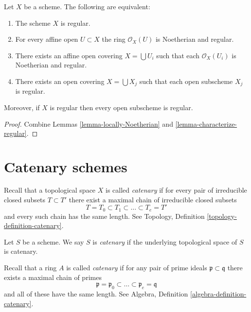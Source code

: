 \begin{lemma}
\label{lemma-locally-regular}
Let $X$ be a scheme. The following are equivalent:
\begin{enumerate}
\item The scheme $X$ is regular.
\item For every affine open $U \subset X$ the ring $\mathcal{O}_X(U)$
is Noetherian and regular.
\item There exists an affine open covering $X = \bigcup U_i$ such that
each $\mathcal{O}_X(U_i)$ is Noetherian and regular.
\item There exists an open covering $X = \bigcup X_j$
such that each open subscheme $X_j$ is regular.
\end{enumerate}
Moreover, if $X$ is regular then every open subscheme is regular.
\end{lemma}

\begin{proof}
Combine Lemmas \ref{lemma-locally-Noetherian}
and \ref{lemma-characterize-regular}.
\end{proof}








\section{Catenary schemes}
\label{section-catenary}

\noindent
Recall that a topological space $X$ is called {\it catenary} if
for every pair of irreducible closed subsets $T \subset T'$
there exist a maximal chain of irreducible closed subsets
$$
T = T_0 \subset T_1 \subset \ldots \subset T_e = T'
$$
and every such chain has the same length. See
Topology, Definition \ref{topology-definition-catenary}.

\begin{definition}
\label{definition-catenary}
Let $S$ be a scheme. We say $S$ is {\it catenary} if the
underlying topological space of $S$ is catenary.
\end{definition}

\noindent
Recall that a ring $A$ is called {\it catenary} if
for any pair of prime ideals $\mathfrak p \subset \mathfrak q$
there exists a maximal chain of primes
$$
\mathfrak p =
\mathfrak p_0 \subset \ldots \subset \mathfrak p_e
= \mathfrak q
$$
and all of these have the same length. See
Algebra, Definition \ref{algebra-definition-catenary}.

